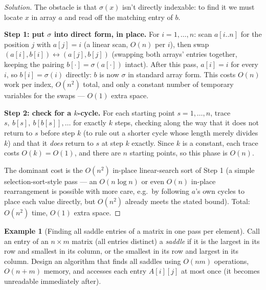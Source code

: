 \documentclass[11pt]{article}
\theoremstyle{definition}
\newtheorem{example}{Example}[section]
\begin{document}
\begin{proof}[Solution]
The obstacle is that $\sigma(x)$ isn't directly indexable: to find it we must locate $x$ in array $a$ and read off the matching entry of $b$.

\textbf{Step 1: put $\sigma$ into direct form, in place.} For $i=1,\dots,n$: scan $a[i..n]$ for the position $j$ with $a[j]=i$ (a linear scan, $O(n)$ per $i$), then swap $(a[i],b[i])\leftrightarrow(a[j],b[j])$ (swapping both arrays' entries together, keeping the pairing $b[\cdot]=\sigma(a[\cdot])$ intact). After this pass, $a[i]=i$ for every $i$, so $b[i]=\sigma(i)$ directly: $b$ is now $\sigma$ in standard array form. This costs $O(n)$ work per index, $O(n^2)$ total, and only a constant number of temporary variables for the swaps — $O(1)$ extra space.

\textbf{Step 2: check for a $k$-cycle.} For each starting point $s=1,\dots,n$, trace $s,\ b[s],\ b[b[s]],\dots$ for exactly $k$ steps, checking along the way that it does not return to $s$ before step $k$ (to rule out a shorter cycle whose length merely divides $k$) and that it \emph{does} return to $s$ at step $k$ exactly. Since $k$ is a constant, each trace costs $O(k)=O(1)$, and there are $n$ starting points, so this phase is $O(n)$.

The dominant cost is the $O(n^2)$ in-place linear-search sort of Step 1 (a simple selection-sort-style pass — an $O(n\log n)$ or even $O(n)$ in-place rearrangement is possible with more care, e.g.\ by following $a$'s own cycles to place each value directly, but $O(n^2)$ already meets the stated bound). Total: $O(n^2)$ time, $O(1)$ extra space.
\end{proof}

\begin{example}[Finding all saddle entries of a matrix in one pass per element]
Call an entry of an $n\times m$ matrix (all entries distinct) a \emph{saddle} if it is the largest in its row and smallest in its column, or the smallest in its row and largest in its column. Design an algorithm that finds all saddles using $O(nm)$ operations, $O(n+m)$ memory, and accesses each entry $A[i][j]$ at most once (it becomes unreadable immediately after).
\end{example}
\end{document}
